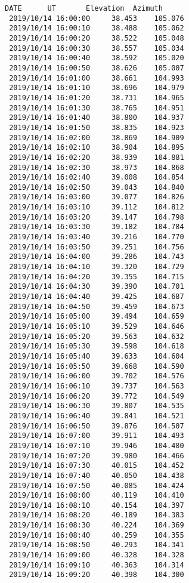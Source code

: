 \documentclass[11pt]{article}
\begin{document}
    \begin{Verbatim}[commandchars=\\\{\}]
    DATE      UT       Elevation  Azimuth
 2019/10/14 16:00:00     38.453    105.076
 2019/10/14 16:00:10     38.488    105.062
 2019/10/14 16:00:20     38.522    105.048
 2019/10/14 16:00:30     38.557    105.034
 2019/10/14 16:00:40     38.592    105.020
 2019/10/14 16:00:50     38.626    105.007
 2019/10/14 16:01:00     38.661    104.993
 2019/10/14 16:01:10     38.696    104.979
 2019/10/14 16:01:20     38.731    104.965
 2019/10/14 16:01:30     38.765    104.951
 2019/10/14 16:01:40     38.800    104.937
 2019/10/14 16:01:50     38.835    104.923
 2019/10/14 16:02:00     38.869    104.909
 2019/10/14 16:02:10     38.904    104.895
 2019/10/14 16:02:20     38.939    104.881
 2019/10/14 16:02:30     38.973    104.868
 2019/10/14 16:02:40     39.008    104.854
 2019/10/14 16:02:50     39.043    104.840
 2019/10/14 16:03:00     39.077    104.826
 2019/10/14 16:03:10     39.112    104.812
 2019/10/14 16:03:20     39.147    104.798
 2019/10/14 16:03:30     39.182    104.784
 2019/10/14 16:03:40     39.216    104.770
 2019/10/14 16:03:50     39.251    104.756
 2019/10/14 16:04:00     39.286    104.743
 2019/10/14 16:04:10     39.320    104.729
 2019/10/14 16:04:20     39.355    104.715
 2019/10/14 16:04:30     39.390    104.701
 2019/10/14 16:04:40     39.425    104.687
 2019/10/14 16:04:50     39.459    104.673
 2019/10/14 16:05:00     39.494    104.659
 2019/10/14 16:05:10     39.529    104.646
 2019/10/14 16:05:20     39.563    104.632
 2019/10/14 16:05:30     39.598    104.618
 2019/10/14 16:05:40     39.633    104.604
 2019/10/14 16:05:50     39.668    104.590
 2019/10/14 16:06:00     39.702    104.576
 2019/10/14 16:06:10     39.737    104.563
 2019/10/14 16:06:20     39.772    104.549
 2019/10/14 16:06:30     39.807    104.535
 2019/10/14 16:06:40     39.841    104.521
 2019/10/14 16:06:50     39.876    104.507
 2019/10/14 16:07:00     39.911    104.493
 2019/10/14 16:07:10     39.946    104.480
 2019/10/14 16:07:20     39.980    104.466
 2019/10/14 16:07:30     40.015    104.452
 2019/10/14 16:07:40     40.050    104.438
 2019/10/14 16:07:50     40.085    104.424
 2019/10/14 16:08:00     40.119    104.410
 2019/10/14 16:08:10     40.154    104.397
 2019/10/14 16:08:20     40.189    104.383
 2019/10/14 16:08:30     40.224    104.369
 2019/10/14 16:08:40     40.259    104.355
 2019/10/14 16:08:50     40.293    104.341
 2019/10/14 16:09:00     40.328    104.328
 2019/10/14 16:09:10     40.363    104.314
 2019/10/14 16:09:20     40.398    104.300

\end{Verbatim}
\end{document}
